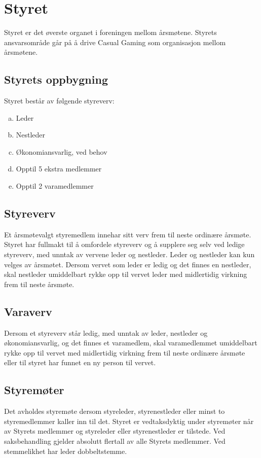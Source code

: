 \chapter{Styret}
Styret er det øverste organet i foreningen mellom årsmøtene. Styrets ansvarsområde går på å drive Casual Gaming som organisasjon mellom årsmøtene.

\section{Styrets oppbygning}
Styret består av følgende styreverv:
\begin{enumerate}[a.]
    \item Leder
    \item Nestleder
    \item Økonomiansvarlig, ved behov
    \item Opptil 5 ekstra medlemmer
    \item Opptil 2 varamedlemmer
\end{enumerate}

\section{Styreverv}
Et årsmøtevalgt styremedlem innehar sitt verv frem til neste ordinære årsmøte. Styret har fullmakt til å omfordele styreverv og å supplere seg selv ved ledige styreverv, med unntak av vervene leder og nestleder. Leder og nestleder kan kun velges av årsmøtet. Dersom vervet som leder er ledig og det finnes en nestleder, skal nestleder umiddelbart rykke opp til vervet leder med midlertidig virkning frem til neste årsmøte.

\section{Varaverv}
Dersom et styreverv står ledig, med unntak av leder, nestleder og økonomiansvarlig, og det finnes et varamedlem, skal varamedlemmet umiddelbart rykke opp til vervet med midlertidig virkning frem til neste ordinære årsmøte eller til styret har funnet en ny person til vervet.

\section{Styremøter}
Det avholdes styremøte dersom styreleder, styrenestleder eller minst to styremedlemmer kaller inn til det. Styret er vedtaksdyktig under styremøter når  av Styrets medlemmer og styreleder eller styrenestleder er tilstede. Ved saksbehandling gjelder absolutt flertall av alle Styrets medlemmer. Ved stemmelikhet har leder dobbeltstemme.

